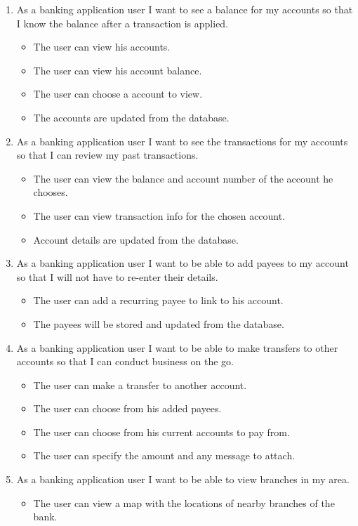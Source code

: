 \begin{itemize}
        \begin{enumerate}
        \item As a banking application user I want to see a balance for my accounts so that I know the balance after a transaction is applied. \cite{userStories}
            \begin{itemize}
                \item The user can view his accounts.
                \item The user can view his account balance.
                \item The user can choose a account to view.
                \item The accounts are updated from the database.
            \end{itemize}
        \item As a banking application user I want to see the transactions for my accounts so that I can review my past transactions.
            \begin{itemize}
                \item The user can view the balance and account number of the account he chooses.
                \item The user can view transaction info for the chosen account.
                \item Account details are updated from the database.
            \end{itemize}
        \item As a banking application user I want to be able to add payees to my account so that I will not have to re-enter their details.
            \begin{itemize}
                \item The user can add a recurring payee to link to his account.
                \item The payees will be stored and updated from the database.
            \end{itemize}
        \item As a banking application user I want to be able to make transfers to other accounts so that I can conduct business on the go.
            \begin{itemize}
                \item The user can make a transfer to another account.
                \item The user can choose from his added payees.
                \item The user can choose from his current accounts to pay from.
                \item The user can specify the amount and any message to attach.
            \end{itemize}
        \item As a banking application user I want to be able to view branches in my area.
            \begin{itemize}
                \item The user can view a map with the locations of nearby branches of the bank.


\end{itemize}
\end{enumerate}
\end{itemize}
